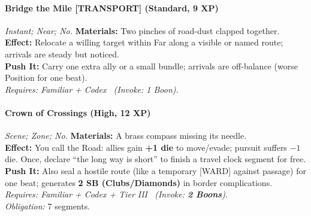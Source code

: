 \paragraph{Bridge the Mile \textnormal{[TRANSPORT]} (Standard, 9 XP)} \emph{Instant; Near; No.}
\textbf{Materials:} Two pinches of road-dust clapped together.\\
\textbf{Effect:} Relocate a willing target within Far along a visible or named route; arrivals are steady but noticed.\\
\textbf{Push It:} Carry one extra ally or a small bundle; arrivals are off-balance (worse Position for one beat).\\
\emph{Requires: Familiar + Codex \ (\textit{Invoke:} 1 Boon).}

\paragraph{Crown of Crossings (High, 12 XP)} \emph{Scene; Zone; No.}
\textbf{Materials:} A brass compass missing its needle.\\
\textbf{Effect:} You call the Road: allies gain \textbf{+1 die} to move/evade; pursuit suffers \(-1\) die. Once, declare “the long way is short” to finish a travel clock segment for free.\\
\textbf{Push It:} Also seal a hostile route (like a temporary [WARD] against passage) for one beat; generates \textbf{2 SB (Clubs/Diamonds)} in border complications.\\
\emph{Requires: Familiar + Codex + Tier III \ (\textit{Invoke:} \textbf{2 Boons}).}\\
\emph{Obligation:} 7 segments.
